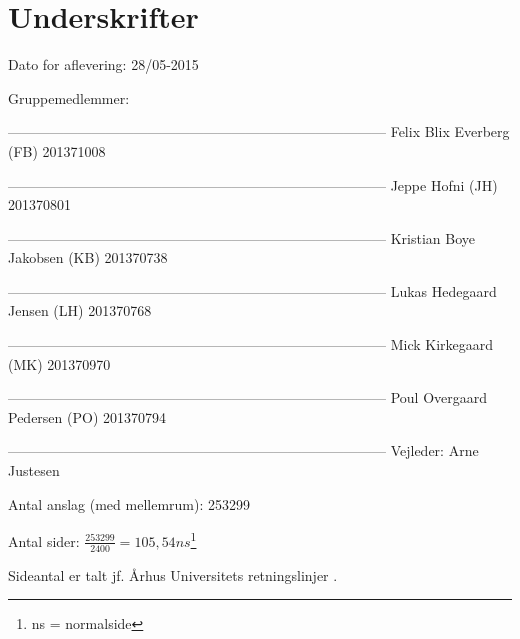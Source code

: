\chapter*{Underskrifter}

Dato for aflevering: 28/05-2015

Gruppemedlemmer: \newline


--------------------------------------------------------------------------------- \newline
Felix Blix Everberg (FB) 201371008\newline



--------------------------------------------------------------------------------- \newline
Jeppe Hofni (JH) 201370801\newline



--------------------------------------------------------------------------------- \newline
Kristian Boye Jakobsen (KB) 201370738\newline



--------------------------------------------------------------------------------- \newline
Lukas Hedegaard Jensen (LH) 201370768\newline



--------------------------------------------------------------------------------- \newline
Mick Kirkegaard (MK) 201370970\newline



--------------------------------------------------------------------------------- \newline
Poul Overgaard Pedersen (PO) 201370794\newline













--------------------------------------------------------------------------------- \newline
Vejleder: Arne Justesen \newline


\vspace{2cm}

Antal anslag (med mellemrum): 253299

Antal sider: $\frac { 253299 }{ 2400 } = 105,54ns$\footnote{ns = normalside}

Sideantal er talt jf. Århus Universitets retningslinjer \citep{aau:formalia}.

\afterpage{\null\newpage}
